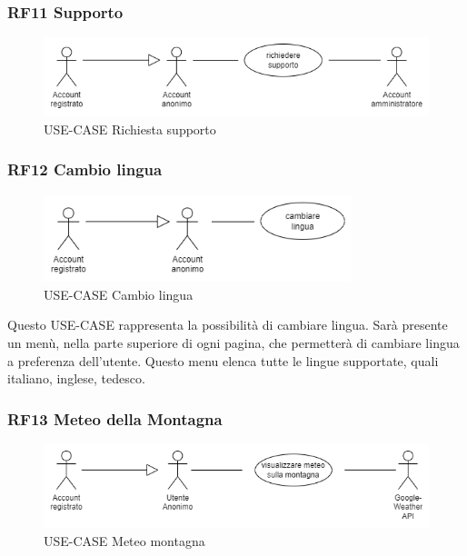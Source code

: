 \documentclass[a4paper,12pt]{article}
\begin{document}
\subsubsection*{RF11 Supporto}
\begin{figure}[H]
   \centering
   \includegraphics[width=1\textwidth]{img-D2/richiesta_supporto.png}
    \caption{USE-CASE Richiesta supporto}
\end{figure}

\subsubsection*{RF12 Cambio lingua}
\begin{figure}[H]
   \centering
   \includegraphics[width=0.8\textwidth]{img-D2/cambio_lingua.png}
    \caption{USE-CASE Cambio lingua}
\end{figure}

Questo USE-CASE rappresenta la possibilità di cambiare lingua.
Sarà presente un menù, nella parte superiore di ogni pagina, che permetterà di cambiare lingua a preferenza dell'utente. 
Questo menu elenca tutte le lingue supportate, quali italiano, inglese, tedesco.

\subsubsection*{RF13 Meteo della Montagna}
\begin{figure}[H]
   \centering
   \includegraphics[width=1\textwidth]{img-D2/meteo.png}
    \caption{USE-CASE Meteo montagna}
\end{figure}
\end{document}
